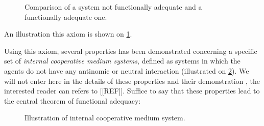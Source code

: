 
\begin{figure}
\centering
{}
\hfill
{}

\caption{Comparison of a system not functionally adequate and a functionally adequate one.}
\label{adequacy_comp}
\end{figure}

An illustration this axiom is shown on \figurename{} \ref{adequacy_comp}.


Using this axiom, several properties has been demonstrated concerning a specific set of \emph{internal cooperative medium systems}, defined as systems in which the agents do not have any antinomic or neutral interaction (illustrated on \figurename{} \ref{internal_cooperative_comp}). We will not enter here in the details of these properties and their demonstration
, the interested reader can refers to [[REF]]. Suffice to say that these properties lead to the central theorem of functional adequacy:


\begin{figure}
\centering
{}
\hfill
{}

\caption{Illustration of internal cooperative medium system.}
\label{internal_cooperative_comp}
\end{figure}

